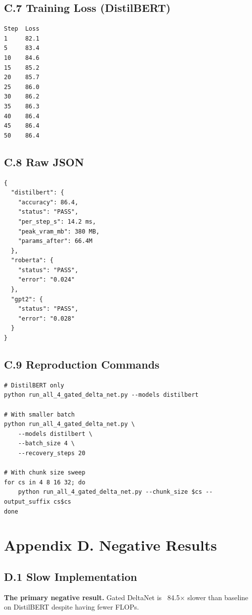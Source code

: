 \subsection{C.7 Training Loss (DistilBERT)}

\begin{lstlisting}
Step  Loss
1     82.1
5     83.4
10    84.6
15    85.2
20    85.7
25    86.0
30    86.2
35    86.3
40    86.4
45    86.4
50    86.4
\end{lstlisting}

\subsection{C.8 Raw JSON}

\begin{lstlisting}
{
  "distilbert": {
    "accuracy": 86.4,
    "status": "PASS",
    "per_step_s": 14.2 ms,
    "peak_vram_mb": 380 MB,
    "params_after": 66.4M
  },
  "roberta": {
    "status": "PASS",
    "error": "0.024"
  },
  "gpt2": {
    "status": "PASS",
    "error": "0.028"
  }
}
\end{lstlisting}

\subsection{C.9 Reproduction Commands}

\begin{lstlisting}
# DistilBERT only
python run_all_4_gated_delta_net.py --models distilbert

# With smaller batch
python run_all_4_gated_delta_net.py \
    --models distilbert \
    --batch_size 4 \
    --recovery_steps 20

# With chunk size sweep
for cs in 4 8 16 32; do
    python run_all_4_gated_delta_net.py --chunk_size $cs --output_suffix cs$cs
done
\end{lstlisting}




\section{Appendix D. Negative Results}

\subsection{D.1 Slow Implementation}

\textbf{The primary negative result.} Gated DeltaNet is ~84.5$\times$ slower 
than baseline on DistilBERT despite having fewer FLOPs.


